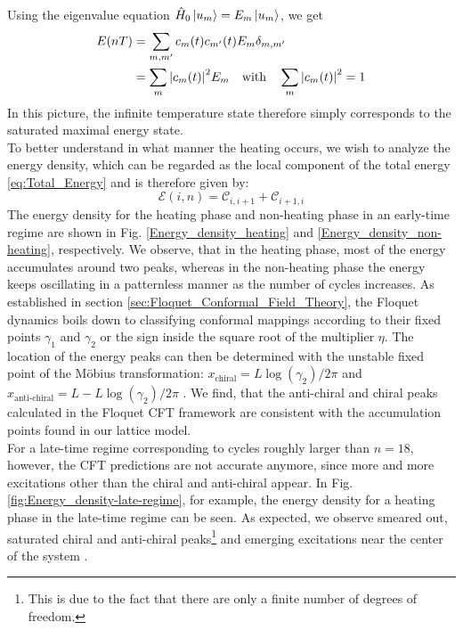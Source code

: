 \documentclass[11pt, a4paper, oneside]{book}
\theoremstyle{definition} %
\begin{document}
Using the eigenvalue equation $\hat{H}_0 \ket{u_m} = E_m \ket{u_m}$, we get
\begin{equation}
\begin{split}
	E(nT) &= \sum_{m,m'} c_m(t) c_{m'}(t) E_m \delta_{m,m'} \\
	&= \sum_m \abs{c_m(t)}^2 E_m \qq{with} \sum_m \abs{c_m(t)}^2 = 1
\end{split}
\end{equation}
In this picture, the infinite temperature state therefore simply corresponds to the saturated maximal energy state. \\

To better understand in what manner the heating occurs, we wish to analyze the energy density, which can be regarded as the local component of the total energy \ref{eq:Total_Energy} and is therefore given by:
\begin{equation}
	\mathcal{E}(i,n) = \mathcal{C}_{i, i+1} + \mathcal{C}_{i+1, i}
\end{equation}
The energy density for the heating phase and non-heating phase  in an early-time regime are shown in Fig. \ref{Energy_density_heating} and \ref{Energy_density_non-heating}, respectively. We observe, that in the heating phase, most of the energy accumulates around two peaks, whereas in the non-heating phase the energy keeps oscillating in a patternless manner as the number of cycles increases. As established in section \ref{sec:Floquet_Conformal_Field_Theory}, the Floquet dynamics boils down to classifying conformal mappings according to their fixed points $\gamma_1$ and $\gamma_2$ or the sign inside the square root of the multiplier $\eta$. The location of the energy peaks can then be determined with the unstable fixed point of the Möbius transformation:
	$x_{\text{chiral}} = L\log(\gamma_2)/2\pi$ and $x_{\text{anti-chiral}} = L - L\log(\gamma_2)/2\pi$ \cite{Xueda}. We find, that the anti-chiral and chiral peaks calculated in the Floquet CFT framework are consistent with the accumulation points found in our lattice model.\\

For a late-time regime corresponding to cycles roughly larger than $n = 18$, however, the CFT predictions are not accurate anymore, since more and more excitations other than the chiral and anti-chiral appear. In Fig. \ref{fig:Energy_density-late-regime}, for example, the energy density for a heating phase in the late-time regime can be seen. As expected, we observe smeared out, saturated chiral and anti-chiral peaks\footnote{This is due to the fact that there are only a finite number of degrees of freedom.} and emerging excitations near the center of the system \cite{Fan}.
\end{document}
